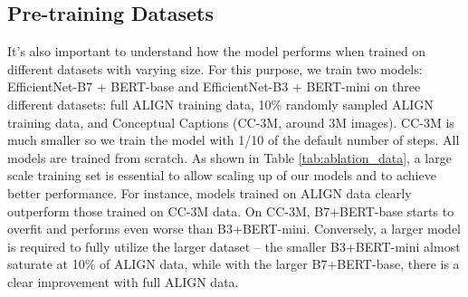 \documentclass{article}
\begin{document}
\begin{table}[h!]
\vspace{-3mm}
\centering
\small
\caption{Ablation study of key architecture parameters. Baseline model (first row) is trained with embedding dimension 640, using all negatives in the batch, and a learnable softmax temperature.}
\label{tab:ablation_params}
\vspace{1mm}
\vspace{-3mm}
\end{table}

\subsection{Pre-training Datasets}
It's also important to understand how the model performs when trained on different  datasets with varying size. For this purpose, we train two models: EfficientNet-B7 + BERT-base and EfficientNet-B3 + BERT-mini on three different datasets: full ALIGN training data, 10\% randomly sampled ALIGN training data, and Conceptual Captions (CC-3M, around 3M images). CC-3M is much smaller so we train the model with 1/10 of the default number of steps. All models are trained from scratch. As shown in Table \ref{tab:ablation_data}, a large scale training set is essential to allow scaling up of our models and to achieve better performance. For instance, models trained on ALIGN data clearly outperform those trained on CC-3M data. On CC-3M, B7+BERT-base starts to overfit and performs even worse than B3+BERT-mini. Conversely, a larger model is required to fully utilize the larger dataset -- the smaller B3+BERT-mini almost saturate at 10\% of ALIGN data, while with the larger B7+BERT-base, there is a clear improvement with full ALIGN data.
\end{document}
